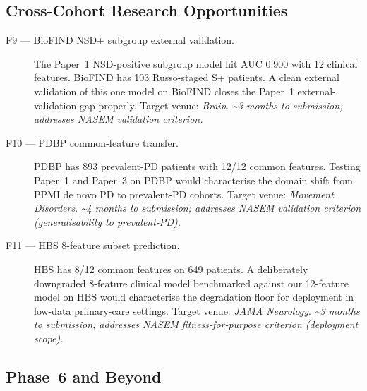 \subsection{Cross-Cohort Research Opportunities}
\label{sec:conc-crosscohort}

\begin{description}
  \item[F9 --- BioFIND NSD+ subgroup external validation.] The Paper~1 NSD-positive subgroup model hit AUC 0.900 with 12 clinical features. BioFIND has 103 Russo-staged S+ patients. A clean external validation of this one model on BioFIND closes the Paper~1 external-validation gap properly. Target venue: \emph{Brain}. \emph{\textasciitilde3 months to submission; addresses NASEM validation criterion.}

  \item[F10 --- PDBP common-feature transfer.] PDBP has 893 prevalent-PD patients with 12/12 common features. Testing Paper~1 and Paper~3 on PDBP would characterise the domain shift from PPMI de novo PD to prevalent-PD cohorts. Target venue: \emph{Movement Disorders}. \emph{\textasciitilde4 months to submission; addresses NASEM validation criterion (generalisability to prevalent-PD).}

  \item[F11 --- HBS 8-feature subset prediction.] HBS has 8/12 common features on 649 patients. A deliberately downgraded 8-feature clinical model benchmarked against our 12-feature model on HBS would characterise the degradation floor for deployment in low-data primary-care settings. Target venue: \emph{JAMA Neurology}. \emph{\textasciitilde3 months to submission; addresses NASEM fitness-for-purpose criterion (deployment scope).}
\end{description}

\subsection{Phase~6 and Beyond}
\label{sec:conc-phase6}

